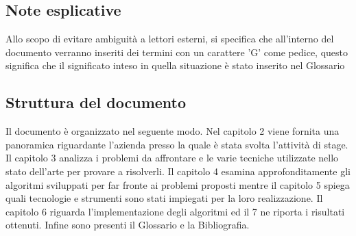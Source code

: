 \subsection{Note esplicative}
Allo scopo di evitare ambiguità a lettori esterni, si specifica che all'interno del documento verranno inseriti dei termini con un carattere 'G' come pedice, questo significa che il significato inteso in quella situazione è stato inserito nel Glossario

\subsection{Struttura del documento}
Il documento è organizzato nel seguente modo. Nel capitolo 2 viene fornita una panoramica riguardante l'azienda presso la quale è stata svolta l'attività di stage. Il capitolo 3 analizza i problemi da affrontare e le varie tecniche utilizzate nello stato dell'arte per provare a risolverli. Il capitolo 4 esamina approfonditamente gli algoritmi sviluppati per far fronte ai problemi proposti mentre il capitolo 5 spiega quali tecnologie e strumenti sono stati impiegati per la loro realizzazione. Il capitolo 6 riguarda l'implementazione degli algoritmi ed il 7 ne riporta i risultati ottenuti. Infine sono presenti il Glossario e la Bibliografia.
